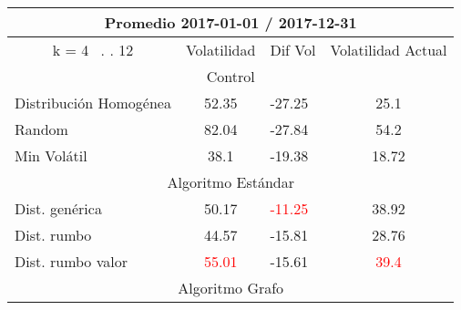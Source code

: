 \documentclass[12pt,a4paper]{article}
\begin{document}
\begin{table}[H]
\centering
\begin{tabular}{l|c|l|c|} 
\hline
\multicolumn{4}{c}{{\cellcolor[rgb]{0.635,0.647,0.788}}Promedio 2017-01-01 / 2017-12-31}                                                                                            \\ 
\hline
\multicolumn{1}{c|}{{\cellcolor[rgb]{0.635,0.647,0.788}}k = 4~ . . 12} & Volatilidad                      & Dif Vol                            & Volatilidad Actual                 \\ 
\hline
\multicolumn{4}{c}{{\cellcolor[rgb]{0.796,0.808,0.984}}Control}                                                                                                                     \\ 
\hline
\rowcolor[rgb]{0.925,0.957,1} Distribución Homogénea                   & 52.35                            & -27.25                             & 25.1                               \\
\rowcolor[rgb]{0.855,0.91,0.988} Random                                & 82.04                            & -27.84                             & 54.2                               \\
\rowcolor[rgb]{0.925,0.957,1} Min Volátil                              & 38.1                             & -19.38                             & 18.72                              \\ 
\hline
\multicolumn{4}{c}{{\cellcolor[rgb]{0.796,0.808,0.984}}Algoritmo Estándar}                                                                                                          \\ 
\hline
\rowcolor[rgb]{0.925,0.957,1} Dist. genérica                           & 50.17                            & \textcolor{red}{-11.25}            & 38.92                              \\
\rowcolor[rgb]{0.855,0.91,0.988} Dist. rumbo                           & 44.57                            & -15.81                             & 28.76                              \\
\rowcolor[rgb]{0.925,0.957,1} Dist. rumbo valor                        & \textcolor{red}{55.01}           & -15.61                             & \textcolor{red}{39.4}              \\ 
\hline
\multicolumn{4}{c}{{\cellcolor[rgb]{0.796,0.808,0.984}}Algoritmo Grafo}                                                                                                             \\ 

\end{tabular}
\end{table}
\end{document}
